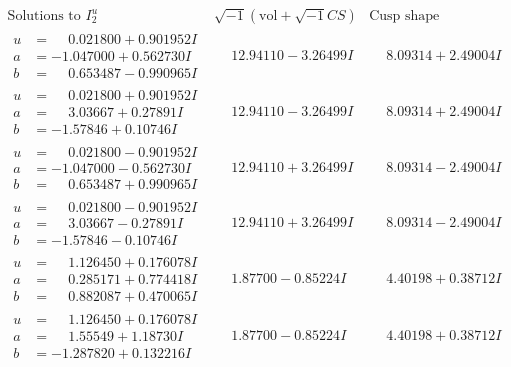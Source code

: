 \documentclass[1p]{elsarticle_modified}
\theoremstyle{definition}
\newcommand{\I}{\sqrt{-1}}
\begin{document}
$$\begin{array}{c|c|c}  
\text{Solutions to }I^u_{2}& \I (\text{vol} + \sqrt{-1}CS) & \text{Cusp shape}\\
 \hline 
\begin{aligned}
u &= \phantom{-}0.021800 + 0.901952 I \\
a &= -1.047000 + 0.562730 I \\
b &= \phantom{-}0.653487 - 0.990965 I\end{aligned}
 & \phantom{-}12.94110 - 3.26499 I & \phantom{-}8.09314 + 2.49004 I \\ \hline\begin{aligned}
u &= \phantom{-}0.021800 + 0.901952 I \\
a &= \phantom{-}3.03667 + 0.27891 I \\
b &= -1.57846 + 0.10746 I\end{aligned}
 & \phantom{-}12.94110 - 3.26499 I & \phantom{-}8.09314 + 2.49004 I \\ \hline\begin{aligned}
u &= \phantom{-}0.021800 - 0.901952 I \\
a &= -1.047000 - 0.562730 I \\
b &= \phantom{-}0.653487 + 0.990965 I\end{aligned}
 & \phantom{-}12.94110 + 3.26499 I & \phantom{-}8.09314 - 2.49004 I \\ \hline\begin{aligned}
u &= \phantom{-}0.021800 - 0.901952 I \\
a &= \phantom{-}3.03667 - 0.27891 I \\
b &= -1.57846 - 0.10746 I\end{aligned}
 & \phantom{-}12.94110 + 3.26499 I & \phantom{-}8.09314 - 2.49004 I \\ \hline\begin{aligned}
u &= \phantom{-}1.126450 + 0.176078 I \\
a &= \phantom{-}0.285171 + 0.774418 I \\
b &= \phantom{-}0.882087 + 0.470065 I\end{aligned}
 & \phantom{-}1.87700 - 0.85224 I & \phantom{-}4.40198 + 0.38712 I \\ \hline\begin{aligned}
u &= \phantom{-}1.126450 + 0.176078 I \\
a &= \phantom{-}1.55549 + 1.18730 I \\
b &= -1.287820 + 0.132216 I\end{aligned}
 & \phantom{-}1.87700 - 0.85224 I & \phantom{-}4.40198 + 0.38712 I \\ \hline\begin{aligned}

\end{aligned}
\end{array}$$
\end{document}
